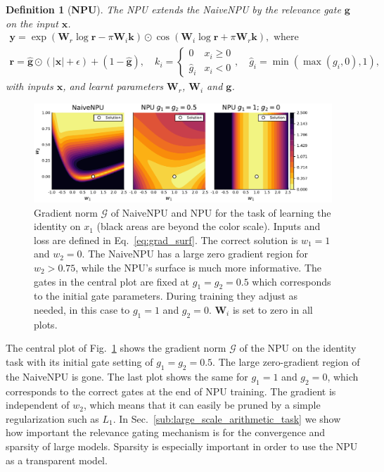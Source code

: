 \documentclass[9pt]{article}
\newtheorem*{definition}{Definition}
\newcommand{\Wre}{\bm W_{r}}
\newcommand{\Wim}{\bm W_{i}}
\begin{document}
\begin{definition}[{\bf NPU}]
  The NPU extends the NaiveNPU by the relevance gate $\bm g$ on the input $\bm x$.
   \begin{gather}
    \label{eq:gatednpu_def}
    \bm y = \exp(\Wre \log\bm r - \pi\Wim\bm k) 
          \odot \cos(\Wim\log \bm r + \pi\Wre\bm k), \text{ where } \\
    \bm r = \bm{\hat g} \odot (|\bm x|+\epsilon) + (1-\bm{\hat g}),
    \quad
    k_i = \begin{cases}
       0  & x_i \geq 0 \\
      \hat g_i & x_i < 0
    \end{cases},
    \quad
    \hat g_i = \min(\max(g_i,0),1),
  \end{gather}
  with inputs $\bm x$, and learnt parameters $\Wre$, $\Wim$ and $\bm g$.
\end{definition}

\begin{figure}
  \centering
  \includegraphics[width=.6\textwidth]{npu_gatednpu_id_grad.pdf}
  \caption{Gradient norm $\mathcal G$ of NaiveNPU and NPU for the task of learning
  the identity on $x_1$ (black areas are beyond the color scale). Inputs and
  loss are defined in Eq.~\ref{eq:grad_surf}. The correct solution is
  $w_1=1$ and $w_2=0$.  The NaiveNPU has a large zero gradient region for
  $w_2>0.75$, while the NPU's surface is much more informative. The gates
  in the central plot are fixed at $g_1=g_2=0.5$ which corresponds to the initial
  gate parameters. During training they adjust as needed, in this case to
  $g_1=1$ and $g_2=0$. $\bm W_i$ is set to zero in all plots.
  }%
  \label{fig:id_loss}
\end{figure}
The central plot of Fig.~\ref{fig:id_loss} shows the gradient norm $\mathcal G$ of the NPU
on the identity task with its initial gate setting of $g_1=g_2=0.5$. The
large zero-gradient region of the NaiveNPU is gone. The last plot shows the
same for $g_1=1$ and $g_2=0$, which corresponds to the correct gates at
the end of NPU training. The gradient is independent of $w_2$, which
means that it can easily be pruned by a simple regularization such as $L_1$. In
Sec.~\ref{sub:large_scale_arithmetic_task} we show how important the relevance
gating mechanism is for the convergence and sparsity of large models.  Sparsity
is especially important in order to use the NPU as a transparent model.
\end{document}
